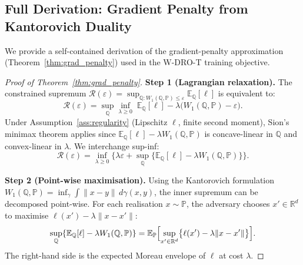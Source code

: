 \documentclass[11pt]{article}
\newcommand{\E}{\mathbb{E}}
\newcommand{\R}{\mathbb{R}}
\newcommand{\PP}{\mathbb{P}}
\newcommand{\QQ}{\mathbb{Q}}
\begin{document}
\subsection{Full Derivation: Gradient Penalty from Kantorovich Duality}

We provide a self-contained derivation of the gradient-penalty approximation (Theorem~\ref{thm:grad_penalty}) used in the W-DRO-T training objective.

\begin{proof}[Proof of Theorem~\ref{thm:grad_penalty}]
\textbf{Step 1 (Lagrangian relaxation).}
The constrained supremum $\mathcal{R}(\varepsilon) = \sup_{\QQ: W_1(\QQ,\PP)\le\varepsilon}\E_\QQ[\ell]$ is equivalent to:
\begin{equation}
    \mathcal{R}(\varepsilon) = \sup_\QQ\inf_{\lambda\ge 0}\;\E_\QQ[\ell] - \lambda\bigl(W_1(\QQ,\PP) - \varepsilon\bigr).
    \label{eq:app_lagrangian}
\end{equation}
Under Assumption~\ref{ass:regularity} (Lipschitz $\ell$, finite second moment), Sion's minimax theorem applies since $\E_\QQ[\ell] - \lambda W_1(\QQ,\PP)$ is concave-linear in $\QQ$ and convex-linear in $\lambda$.  We interchange sup-inf:
\begin{equation}
    \mathcal{R}(\varepsilon) = \inf_{\lambda\ge 0}\bigl\{\lambda\varepsilon + \sup_\QQ\bigl\{\E_\QQ[\ell] - \lambda W_1(\QQ,\PP)\bigr\}\bigr\}.
    \label{eq:app_dual1}
\end{equation}

\textbf{Step 2 (Point-wise maximisation).}
Using the Kantorovich formulation $W_1(\QQ,\PP) = \inf_\gamma\int\|x-y\|\,d\gamma(x,y)$, the inner supremum can be decomposed point-wise.  For each realisation $x \sim \PP$, the adversary chooses $x' \in \R^d$ to maximise $\ell(x') - \lambda\|x-x'\|$:
\begin{equation}
    \sup_\QQ\{\E_\QQ[\ell] - \lambda W_1(\QQ,\PP)\} = \E_\PP\Bigl[\sup_{x'\in\R^d}\bigl\{\ell(x') - \lambda\|x-x'\|\bigr\}\Bigr].
    \label{eq:app_pointwise}
\end{equation}
The right-hand side is the expected Moreau envelope of $\ell$ at cost $\lambda$.


\end{proof}
\end{document}
